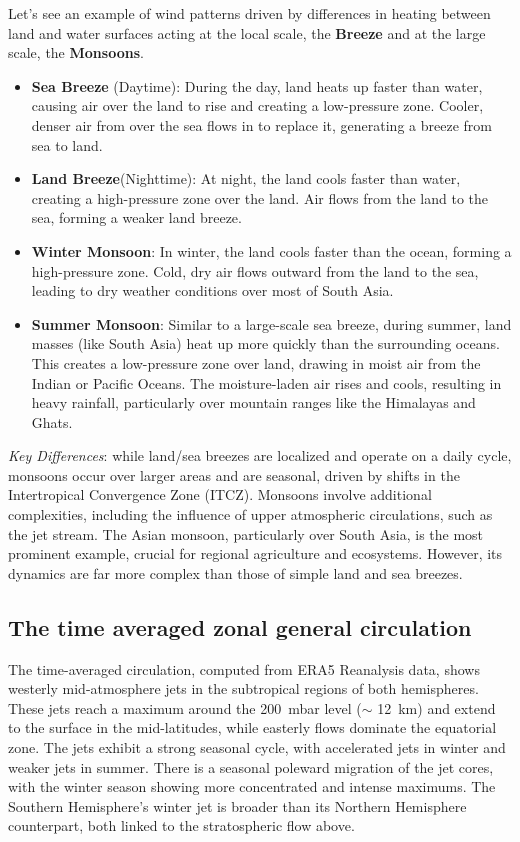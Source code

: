 Let's see an example of wind patterns driven by differences in heating between land and water surfaces acting at the local scale, the \textbf{Breeze} and at the large scale, the \textbf{Monsoons}.
\begin{itemize}
	\item \textbf{Sea Breeze} (Daytime): During the day, land heats up faster than water, causing air over the land to rise and creating a low-pressure zone. Cooler, denser air from over the sea flows in to replace it, generating a breeze from sea to land.
	\item \textbf{Land Breeze}(Nighttime): At night, the land cools faster than water, creating a high-pressure zone over the land. Air flows from the land to the sea, forming a weaker land breeze.
	\item  \textbf{Winter Monsoon}: In winter, the land cools faster than the ocean, forming a high-pressure zone. Cold, dry air flows outward from the land to the sea, leading to dry weather conditions over most of South Asia.
	\item \textbf{Summer Monsoon}: Similar to a large-scale sea breeze, during summer, land masses (like South Asia) heat up more quickly than the surrounding oceans. This creates a low-pressure zone over land, drawing in moist air from the Indian or Pacific Oceans. The moisture-laden air rises and cools, resulting in heavy rainfall, particularly over mountain ranges like the Himalayas and Ghats.
\end{itemize}
\emph{Key Differences}: while land/sea breezes are localized and operate on a daily cycle, monsoons occur over larger areas and are seasonal, driven by shifts in the Intertropical Convergence Zone (ITCZ).
Monsoons involve additional complexities, including the influence of upper atmospheric circulations, such as the jet stream.
The Asian monsoon, particularly over South Asia, is the most prominent example, crucial for regional agriculture and ecosystems. However, its dynamics are far more complex than those of simple land and sea breezes.

\subsection{The time averaged zonal general circulation}
The time-averaged circulation, computed from ERA5 Reanalysis data, shows westerly mid-atmosphere jets in the subtropical regions of both hemispheres. These jets reach a maximum around the \qty{200}{\milli \bar} level ($\sim$ \qty{12}{\kilo\meter}) and extend to the surface in the mid-latitudes, while easterly flows dominate the equatorial zone. The jets exhibit a strong seasonal cycle, with accelerated jets in winter and weaker jets in summer. There is a seasonal poleward migration of the jet cores, with the winter season showing more concentrated and intense maximums. The Southern Hemisphere's winter jet is broader than its Northern Hemisphere counterpart, both linked to the stratospheric flow above.

